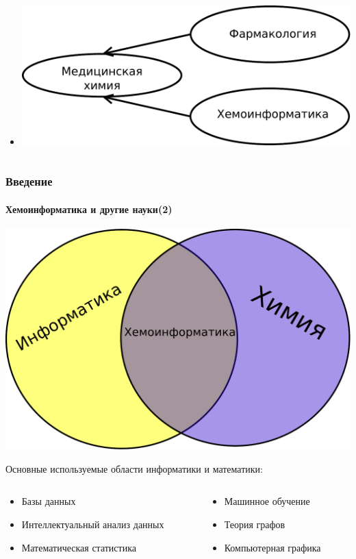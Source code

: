 \begin{frame}
\begin{columns}
\begin{column}{0.5\textwidth}
\begin{itemize}
      \item \includegraphics[scale=0.29]{images/Diagram4.pdf}
      \end{itemize}
    \end{column}
  \end{columns}
\end{frame}

\begin{frame}
  \frametitle{Введение}
  \framesubtitle{Хемоинформатика и другие науки(2)}

  \begin{center}
    \includegraphics[scale=0.3]{images/Diagram5.pdf}
  \end{center}

  Основные используемые области информатики и математики:
  \begin{columns}
    \begin{column}{0.5\textwidth}
  \begin{itemize}
    \item Базы данных
    \item Интеллектуальный анализ данных
    \item Математическая статистика
   \end{itemize}
\end{column}
\begin{column}{0.5\textwidth}
  \begin{itemize}
   \item Машинное обучение
    \item Теория графов
    \item Компьютерная графика
      \end{itemize}

\end{column}
\end{columns}
\end{frame}

